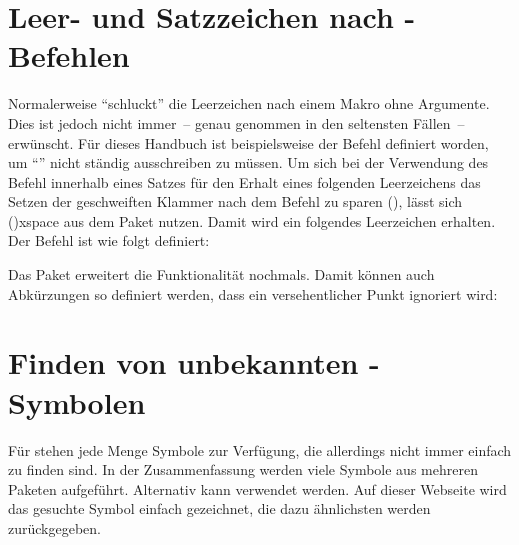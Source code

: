 \section{%
  Leer- und Satzzeichen nach -Befehlen%
  \label{sec:tips:xspace}%
}

Normalerweise \enquote{schluckt}  die Leerzeichen nach einem 
Makro ohne Argumente. Dies ist jedoch nicht immer~-- genau genommen in den 
seltensten Fällen~-- erwünscht. Für dieses Handbuch ist beispielsweise der 
Befehl  definiert worden, um \enquote{\TUD{}} nicht ständig 
ausschreiben zu müssen. Um sich bei der Verwendung des Befehl innerhalb eines 
Satzes für den Erhalt eines folgenden Leerzeichens das Setzen der geschweiften 
Klammer nach dem Befehl zu sparen (), lässt sich  
\Macro(){xspace} aus dem Paket  nutzen. 
Damit wird ein folgendes Leerzeichen erhalten. Der Befehl  ist wie 
folgt definiert:
%
\begin{quoting}
\begin{Code}
\newcommand*\TUD{Technische Universit\"at Dresden\xspace}
\end{Code}
\end{quoting}
%
Das Paket  erweitert die Funktionalität nochmals. Damit 
können auch Abkürzungen so definiert werden, dass ein versehentlicher Punkt 
ignoriert wird:
%
\begin{quoting}
\begin{Code}
\newcommand*\zB{z.\,B\xperiod}
\end{Code}
\end{quoting}



\section{%
  Finden von unbekannten -Symbolen%
}

Für  stehen jede Menge Symbole zur Verfügung, die allerdings 
nicht immer einfach zu finden sind. In der Zusammenfassung
werden viele Symbole aus mehreren Paketen aufgeführt. Alternativ kann 
 verwendet werden. 
Auf dieser Webseite wird das gesuchte Symbol einfach gezeichnet, die dazu 
ähnlichsten werden zurückgegeben.



